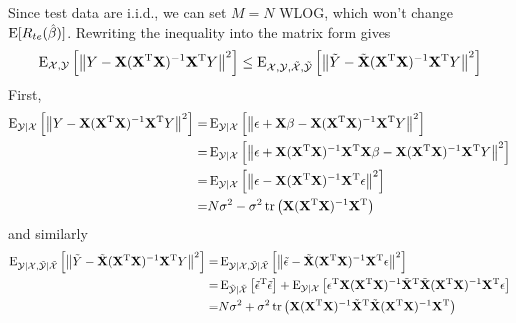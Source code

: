 \begin{sol}
Since test data are i.i.d., we can set $M=N$ WLOG, which won't change $\operatorname{E}[R_{te}(\hat{\beta})]$. Rewriting the inequality into the matrix form gives
\[
\operatorname{E}_{\mathcal{X},\mathcal{Y}}\left[\left\|Y-\mathbf{X}(\mathbf{X}^\mathrm{T}\mathbf{X})^{-1}\mathbf{X}^\mathrm{T}Y\right\|^2\right] \le \operatorname{E}_{\mathcal{X},\mathcal{Y},\tilde{\mathcal{X}},\tilde{\mathcal{Y}}}\left[\left\|\tilde{Y}-\tilde{\mathbf{X}}(\mathbf{X}^\mathrm{T}\mathbf{X})^{-1}\mathbf{X}^\mathrm{T}Y\right\|^2\right]
\]
First,
\begin{align*}
\operatorname{E}_{\mathcal{Y}\vert \mathcal{X}}\left[\left\|Y-\mathbf{X}(\mathbf{X}^\mathrm{T}\mathbf{X})^{-1}\mathbf{X}^\mathrm{T}Y\right\|^2\right] =& \operatorname{E}_{\mathcal{Y}\vert \mathcal{X}}\left[\left\|\epsilon+\mathbf{X}\beta-\mathbf{X}(\mathbf{X}^\mathrm{T}\mathbf{X})^{-1}\mathbf{X}^\mathrm{T}Y\right\|^2\right] \\
=& \operatorname{E}_{\mathcal{Y}\vert \mathcal{X}}\left[\left\|\epsilon+\mathbf{X}(\mathbf{X}^\mathrm{T}\mathbf{X})^{-1}\mathbf{X}^\mathrm{T}\mathbf{X}\beta-\mathbf{X}(\mathbf{X}^\mathrm{T}\mathbf{X})^{-1}\mathbf{X}^\mathrm{T}Y\right\|^2\right]\\
=& \operatorname{E}_{\mathcal{Y}\vert \mathcal{X}}\left[\left\|\epsilon-\mathbf{X}(\mathbf{X}^\mathrm{T}\mathbf{X})^{-1}\mathbf{X}^\mathrm{T}\epsilon\right\|^2\right] \\
=& N\sigma^2-\sigma^2\operatorname{tr}\left(\mathbf{X}(\mathbf{X}^\mathrm{T}\mathbf{X})^{-1}\mathbf{X}^\mathrm{T}\right)
\end{align*}
and similarly
\begin{align*}
\E_{\mathcal{Y}\vert \mathcal{X},\tilde{\mathcal{Y}}\vert \tilde{\mathcal{X}}}\left[\left\|\tilde{Y}-\tilde{\mathbf{X}}(\mathbf{X}^\mathrm{T}\mathbf{X})^{-1}\mathbf{X}^\mathrm{T}Y\right\|^2\right] =& \E_{\mathcal{Y}\vert \mathcal{X},\tilde{\mathcal{Y}}\vert \tilde{\mathcal{X}}}\left[\left\|\tilde{\epsilon}-\tilde{\mathbf{X}}(\mathbf{X}^\mathrm{T}\mathbf{X})^{-1}\mathbf{X}^\mathrm{T}\epsilon\right\|^2\right] \\
=& \E_{\tilde{\mathcal{Y}}\vert \tilde{\mathcal{X}}}\left[\tilde{\epsilon}^\mathrm{T}\tilde{\epsilon}\right] + \E_{\mathcal{Y}\vert \mathcal{X}}\left[\epsilon^\mathrm{T}\mathbf{X}(\mathbf{X}^\mathrm{T}\mathbf{X})^{-1}\tilde{\mathbf{X}}^\mathrm{T}\tilde{\mathbf{X}}(\mathbf{X}^\mathrm{T}\mathbf{X})^{-1}\mathbf{X}^\mathrm{T}\epsilon\right] \\
=& N\sigma^2+\sigma^2\tr\left(\mathbf{X}(\mathbf{X}^\mathrm{T}\mathbf{X})^{-1}\tilde{\mathbf{X}}^\mathrm{T}\tilde{\mathbf{X}}(\mathbf{X}^\mathrm{T}\mathbf{X})^{-1}\mathbf{X}^\mathrm{T}\right)

\end{align*}
\end{sol}
